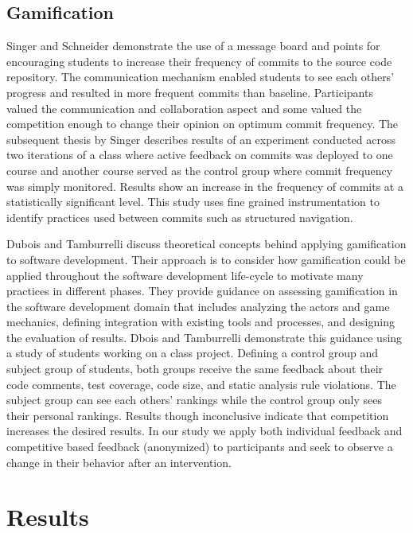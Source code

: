 \documentclass{sig-alternate}
\begin{document}
\subsection{Gamification}
Singer and Schneider demonstrate the use of a message board and points for encouraging students to increase their frequency of commits to the source code repository.\cite{Singer2012It}  The communication mechanism enabled students to see each others' progress and resulted in more frequent commits than baseline.  Participants valued the communication and collaboration aspect and some valued the competition enough to change their opinion on optimum commit frequency.  The subsequent thesis by Singer \cite{Singer2013a} describes results of an experiment conducted across two iterations of a class where active feedback on commits was deployed to one course and another course served as the control group where commit frequency was simply monitored.  Results show an increase in the frequency of commits at a statistically significant level.  This study uses fine grained instrumentation to identify practices used between commits such as structured navigation.

Dubois and Tamburrelli discuss theoretical concepts behind applying gamification to software development. \cite{Dubois2013Understanding} Their approach is to consider how gamification could be applied throughout the software development life-cycle to motivate many practices in different phases.  They provide guidance on assessing gamification in the software development domain that includes analyzing the actors and game mechanics, defining integration with existing tools and processes, and designing the evaluation of results.  Dbois and Tamburrelli demonstrate this guidance using a study of students working on a class project.  Defining a control group and subject group of students, both groups receive the same feedback about their code comments, test coverage, code size, and static analysis rule violations.  The subject group can see each others' rankings while the control group only sees their personal rankings.  Results though inconclusive indicate that competition increases the desired results.  In our study we apply both individual feedback and competitive based feedback (anonymized) to participants and seek to observe a change in their behavior after an intervention.


\section{Results}
\end{document}
